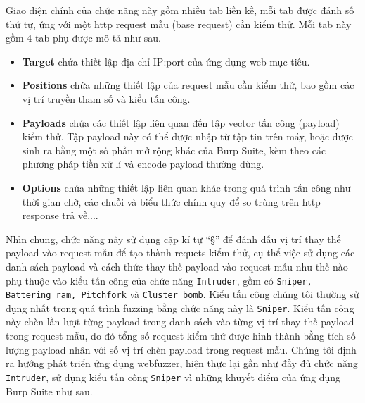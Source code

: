 Giao diện chính của chức năng này gồm nhiều tab liền kề, mỗi tab được đánh số thứ tự, ứng với một \acrshort{http} request mẫu (base request) cần kiểm thử. Mỗi tab này gồm 4 tab phụ được mô tả như sau.
\begin{itemize}
    \item \textbf{Target} chứa thiết lập địa chỉ IP:port của ứng dụng web mục tiêu.
    \item \textbf{Positions} chứa những thiết lập của request mẫu cần kiểm thử, bao gồm các vị trí truyền tham số và kiểu tấn công.
    \item \textbf{Payloads} chứa các thiết lập liên quan đến tập vector tấn công (payload) kiểm thử. Tập payload này có thể được nhập từ tập tin trên máy, hoặc được sinh ra bằng một số phần mở rộng khác của Burp Suite, kèm theo các phương pháp tiền xử lí và encode payload thường dùng.
    \item \textbf{Options} chứa những thiết lập liên quan khác trong quá trình tấn công như thời gian chờ, các chuỗi và biểu thức chính quy để so trùng trên \acrshort{http} response trả về,...
\end{itemize}
Nhìn chung, chức năng này sử dụng cặp kí tự ``§'' để đánh dấu vị trí thay thế payload vào request mẫu để tạo thành requets kiểm thử, cụ thể việc sử dụng các danh sách payload và cách thức thay thế payload vào request mẫu như thế nào phụ thuộc vào kiểu tấn công của chức năng \texttt{Intruder}, gồm có \texttt{Sniper, Battering ram, Pitchfork} và \texttt{Cluster bomb}. Kiểu tấn công chúng tôi thường sử dụng nhất trong quá trình fuzzing bằng chức năng này là \texttt{Sniper}. Kiểu tấn công này chèn lần lượt từng payload trong danh sách vào từng vị trí thay thế payload trong request mẫu, do đó tổng số request kiểm thử được hình thành bằng tích số lượng payload nhân với số vị trí chèn payload trong request mẫu. Chúng tôi định ra hướng phát triển ứng dụng webfuzzer, hiện thực lại gần như đầy đủ chức năng \texttt{Intruder}, sử dụng kiểu tấn công \texttt{Sniper} vì những khuyết điểm của ứng dụng Burp Suite như sau.
